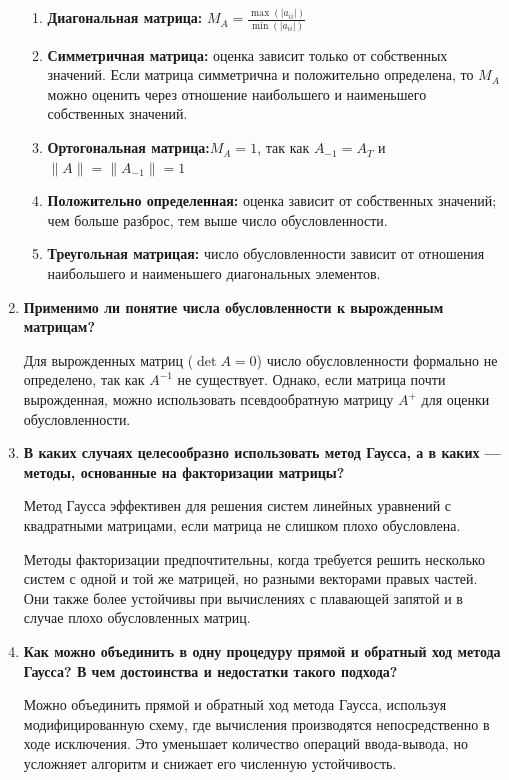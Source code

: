 \documentclass[12pt, a4paper]{article}
\begin{document}
\begin{enumerate}
	\begin{enumerate}
		\item \textbf{ Диагональная матрица:} $M_{A}=\frac{\max(|a_{ii}|)}{\min (|a_{ii}|)}$
		\item \textbf{ Симметричная матрица:} оценка зависит только от собственных значений. Если матрица симметрична и положительно определена, то $M_{A}$ можно оценить через отношение наибольшего и наименьшего собственных значений.
		\item \textbf{ Ортогональная матрица:}$M_{A}=1$, так как $A_{-1}=A_{T}$ и $\|A\|=\|A_{-1}\|=1$
		\item \textbf{ Положительно определенная:} оценка зависит от собственных значений; чем больше разброс, тем выше число обусловленности.
		\item \textbf{ Треугольная матрицая:} число обусловленности зависит от отношения наибольшего и наименьшего диагональных элементов.
	\end{enumerate}
	
	\item \textbf{Применимо ли понятие числа обусловленности к вырожденным матрицам?}
	
		Для вырожденных матриц ($\det A = 0$) число обусловленности формально не определено, так как $A^{-1}$
		не существует. Однако, если матрица почти вырожденная, можно использовать псевдообратную матрицу $A^{+}$
		для оценки обусловленности.
	\item \textbf{В каких случаях целесообразно использовать метод Гаусса,
	а в каких — методы, основанные на факторизации матрицы?}
	
		Метод Гаусса эффективен для решения систем линейных уравнений с квадратными матрицами, если матрица не слишком плохо обусловлена.
		
		Методы факторизации предпочтительны, когда требуется решить несколько систем с одной и той же матрицей, но разными векторами правых частей. Они также более устойчивы при вычислениях с плавающей запятой и в случае плохо обусловленных матриц.
	
	\item \textbf{Как можно объединить в одну процедуру прямой и обратный ход метода Гаусса? В чем достоинства и недостатки такого подхода?}
	
		Можно объединить прямой и обратный ход метода Гаусса, используя модифицированную схему, где вычисления производятся непосредственно в ходе исключения. Это уменьшает количество операций ввода-вывода, но усложняет алгоритм и снижает его численную устойчивость.
	

\end{enumerate}
\end{document}
